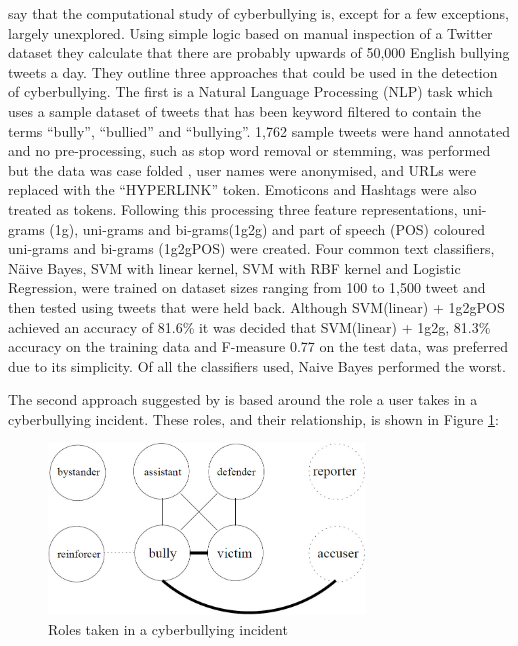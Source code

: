 \citet{xu_learning_2012} say that the computational study of cyberbullying is, except for a few exceptions, largely unexplored. Using simple logic based on manual inspection of a Twitter dataset they calculate that there are probably upwards of 50,000 English bullying tweets a day. They outline three approaches that could be used in the detection of cyberbullying. The first is a Natural Language Processing (NLP) task which uses a sample dataset of tweets that has been keyword filtered to contain the terms ``bully'', ``bullied'' and ``bullying''. 1,762 sample tweets were hand annotated and no pre-processing, such as stop word removal or stemming, was performed but the data was case folded \cite{settles_closing_2011}, user names were anonymised, and URLs were replaced with the ``HYPERLINK'' token. Emoticons and Hashtags were also treated as tokens. Following this processing three feature representations, uni-grams (1g), uni-grams and bi-grams(1g2g) and part of speech (POS) coloured uni-grams and bi-grams (1g2gPOS) were created. Four common text classifiers, Näive Bayes, SVM with linear kernel, SVM with RBF kernel and Logistic Regression, were trained on dataset sizes ranging from 100 to 1,500 tweet and then tested using tweets that were held back. Although SVM(linear) + 1g2gPOS achieved an accuracy of 81.6\%  it was decided that SVM(linear) + 1g2g, 81.3\% accuracy on the training data and F-measure 0.77 on the test data, was preferred due to its simplicity. Of all the classifiers used, Naive Bayes performed the worst.

The second approach suggested by \citet{xu_learning_2012} is based around the role a user takes in a cyberbullying incident. These roles, and their relationship, is shown in Figure \ref{fig:xu_learning_2012_01}:

\begin{figure}[htbp]
	\centering
	\includegraphics[width=0.75\textwidth]{Figures/Chapter3/xu_learning_2012_01.jpg}
	\caption[Roles taken in a cyberbullying incident]{Roles taken in a cyberbullying incident \citet{xu_learning_2012}}
	\label{fig:xu_learning_2012_01}
\end{figure}

